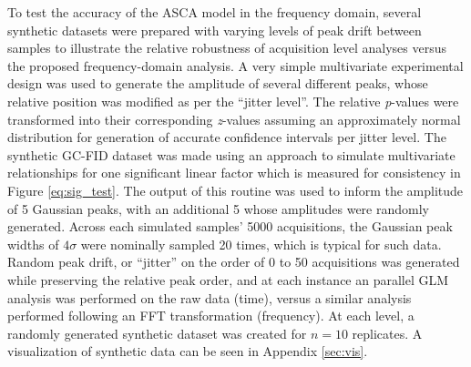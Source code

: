 \documentclass[preprint,12pt]{elsarticle}
\begin{document}
To test the accuracy of the ASCA model in the frequency domain, several synthetic datasets were prepared with varying levels of peak drift between samples to illustrate the relative robustness of acquisition level analyses versus the proposed frequency-domain analysis. A very simple multivariate experimental design was used to generate the amplitude of several different peaks, whose relative position was modified as per the ``jitter level''. The relative \textit{p}-values were transformed into their corresponding \textit{z}-values assuming an approximately normal distribution for generation of accurate confidence intervals per jitter level. The synthetic GC-FID dataset was made using an approach to simulate multivariate relationships \cite{Camacho2016} for one significant linear factor which is measured for consistency in Figure \ref{eq:sig_test}. The output of this routine was used to inform the amplitude of 5 Gaussian peaks, with an additional 5 whose amplitudes were randomly generated. Across each simulated samples' 5000 acquisitions, the Gaussian peak widths of $4\sigma$ were nominally sampled 20 times, which is typical for such data. Random peak drift, or ``jitter'' on the order of 0 to 50 acquisitions was generated while preserving the relative peak order, and at each instance an parallel GLM analysis was performed on the raw data (time), versus a similar analysis performed following an FFT transformation (frequency). At each level, a randomly generated synthetic dataset was created for $n=10$ replicates. A visualization of synthetic data can be seen in Appendix \ref{sec:vis}.
\end{document}
